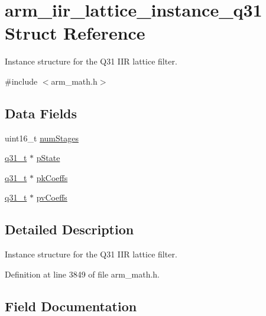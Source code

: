 \hypertarget{structarm__iir__lattice__instance__q31}{}\section{arm\+\_\+iir\+\_\+lattice\+\_\+instance\+\_\+q31 Struct Reference}
\label{structarm__iir__lattice__instance__q31}


Instance structure for the Q31 I\+IR lattice filter.  




{\ttfamily \#include $<$arm\+\_\+math.\+h$>$}

\subsection*{Data Fields}
\begin{DoxyCompactItemize}
\item 
uint16\+\_\+t \hyperlink{structarm__iir__lattice__instance__q31_a4cceb90547b3e585d4c7aabaa8057212}{num\+Stages}
\item 
\hyperlink{arm__math_8h_adc89a3547f5324b7b3b95adec3806bc0}{q31\+\_\+t} $\ast$ \hyperlink{structarm__iir__lattice__instance__q31_adee4ba3ee8869865af7d8fa08ca913d6}{p\+State}
\item 
\hyperlink{arm__math_8h_adc89a3547f5324b7b3b95adec3806bc0}{q31\+\_\+t} $\ast$ \hyperlink{structarm__iir__lattice__instance__q31_a9d45339bf841bf86aec57be5f70d2b01}{pk\+Coeffs}
\item 
\hyperlink{arm__math_8h_adc89a3547f5324b7b3b95adec3806bc0}{q31\+\_\+t} $\ast$ \hyperlink{structarm__iir__lattice__instance__q31_a3d7de56fe9de3458f033a64f14407533}{pv\+Coeffs}
\end{DoxyCompactItemize}


\subsection{Detailed Description}
Instance structure for the Q31 I\+IR lattice filter. 

Definition at line 3849 of file arm\+\_\+math.\+h.



\subsection{Field Documentation}
